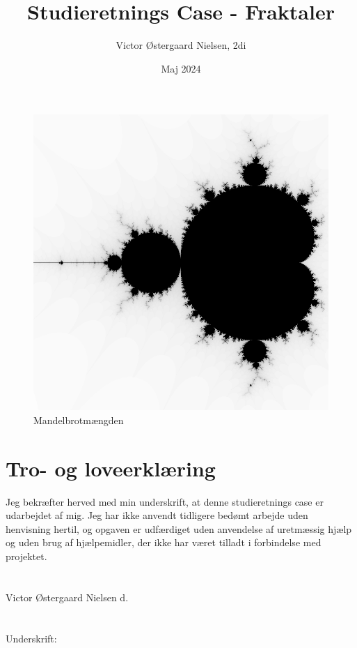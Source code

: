 \documentclass{article}
\title{Studieretnings Case - Fraktaler}
\author{Victor Østergaard Nielsen, 2di}
\date{Maj 2024}
\begin{document}
\maketitle

\section*{}
\begin{figure}[!h]
    \centering
    \includegraphics[width=0.7\linewidth]{fractal1.png}
    \caption{Mandelbrotmængden}
    \label{mandelbrotmængden}
\end{figure}

\newpage

\section*{Tro- og loveerklæring}
Jeg bekræfter herved med min underskrift, at denne studieretnings case er udarbejdet af mig. Jeg har ikke anvendt tidligere bedømt arbejde uden henvisning hertil, og opgaven er udfærdiget uden anvendelse af uretmæssig hjælp og uden brug af hjælpemidler, der ikke har været tilladt i forbindelse med projektet.\\\\\\
%
Victor Østergaard Nielsen d. \hrulefill\\\\\\
%
Underskrift: \hrulefill\\

\newpage
\end{document}

